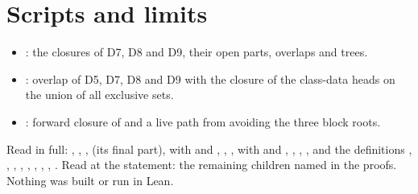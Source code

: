 \documentclass[11pt]{article}
\theoremstyle{definition}
\theoremstyle{remark}
\begin{document}
\appendix
\section{Scripts and limits}
\begin{itemize}[leftmargin=*,itemsep=1pt]
\item {}: the closures of D7, D8 and D9, their open parts, overlaps and trees.
\item {}: overlap of D5, D7, D8 and D9 with the closure of the class-data heads on the union of all exclusive sets.
\item {}: forward closure of  and a live path from  avoiding the three block roots.
\end{itemize}
Read in full: , , ,  (its final part),  with  and , , ,  with  and , , , , and the definitions , , , , , , , , . Read at the statement: the remaining children named in the proofs. Nothing was built or run in Lean.
\end{document}
